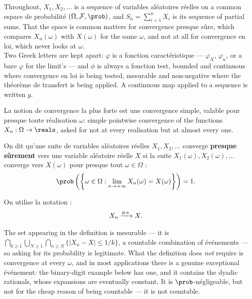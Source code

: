\begin{notation}
  Throughout, $X_{1}, X_{2}, \dots$ is a sequence of variables aléatoires réelles
  on a common espace de probabilité $(\Omega, \mathcal{F}, \prob)$, and
  $S_{n} = \sum_{i=1}^{n} X_{i}$ is its sequence of partial sums. That the space
  is common matters for convergence presque sûre, which compares
  $X_{n}(\omega)$ with $X(\omega)$ for the same $\omega$, and not at all for
  convergence en loi, which never looks at $\omega$.\\
  Two Greek letters are kept apart: $\varphi$ is a fonction caractéristique ---
  $\varphi_{X}$, $\varphi_{n}$, or a bare $\varphi$ for the limit's --- and
  $\phi$ is always a fonction test, bounded and continuous where convergence en
  loi is being tested, mesurable and non-negative where the théorème de
  transfert is being applied. A continuous map applied to a sequence is written
  $g$.
\end{notation}

La notion de convergence la plus forte est une convergence simple, valable pour
presque toute réalisation $\omega$: simple pointwise convergence of the
functions $X_{n} : \Omega \to \reals$, asked for not at every realisation but at
almost every one.

\begin{definition}
  On dit qu'une suite de variables aléatoires réelles $X_{1}, X_{2}, \dots$
  converge \textbf{presque sûrement} vers une variable aléatoire réelle $X$ si
  la suite $X_{1}(\omega), X_{2}(\omega), \dots$ converge
  vers $X(\omega)$ pour presque tout $\omega \in \Omega$ :
  \[
    \prob\left(\left\{\omega \in \Omega : \lim_{n \to +\infty} X_{n}(\omega)
      = X(\omega)\right\}\right) = 1 .
  \]
\end{definition}

\begin{notation}
  On utilise la notation :
  \[
    X_{n} \xrightarrow{\text{p.s.}} X .
  \]
\end{notation}

The set appearing in the definition is mesurable --- it is
$\bigcap_{k \geq 1} \bigcup_{N \geq 1} \bigcap_{n \geq N}
\{|X_{n} - X| \leq 1/k\}$, a countable combination of événements --- so asking
for its probability is legitimate. What the definition does \emph{not} require
is convergence at every $\omega$, and in most applications there is a genuine
exceptional événement: the binary-digit example below has one, and it contains
the dyadic rationals, whose expansions are eventually constant. It is
$\prob$-négligeable, but not for the cheap reason of being countable --- it is
not countable.

